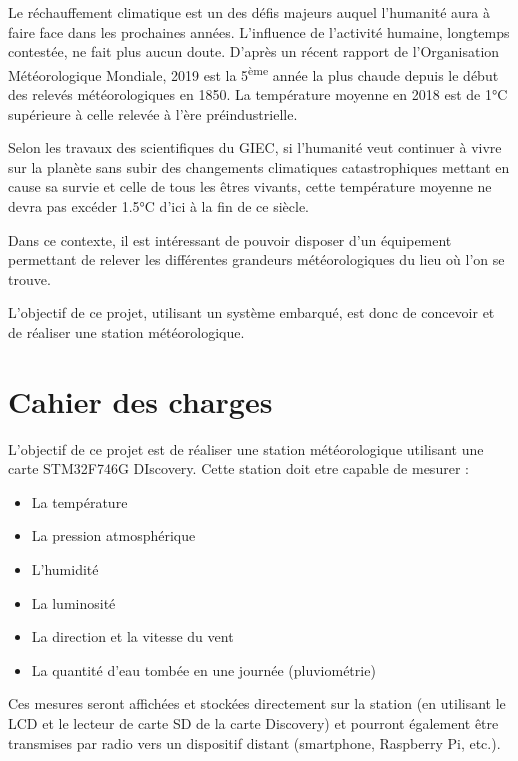 \documentclass[12pt]{article}
\begin{document}
 







\tableofcontents
\label{toc} %


\listoffigures

\newpage


\clearpage
\setcounter{page}{3}

\pagestyle{fancy}


Le réchauffement climatique est un des défis majeurs auquel l’humanité aura à faire face dans les prochaines années. L’influence de l’activité humaine, longtemps contestée, ne fait plus aucun doute. D’après un récent rapport de l’Organisation Météorologique Mondiale, 2019 est la 5\textsuperscript{ème} année la plus chaude depuis le début des relevés météorologiques en 1850. La température moyenne en 2018 est de 1°C supérieure à celle relevée à l’ère préindustrielle.

Selon les travaux des scientifiques du GIEC, si l’humanité veut continuer à vivre sur la planète sans subir des changements climatiques catastrophiques mettant en cause sa survie et celle de tous les êtres vivants, cette température moyenne ne devra pas excéder 1.5°C d’ici à la fin de ce siècle.

Dans ce contexte, il est intéressant de pouvoir disposer d’un équipement permettant de relever les différentes grandeurs météorologiques du lieu où l’on se trouve.

L’objectif de ce projet, utilisant un système embarqué, est donc de concevoir et de réaliser une station météorologique.

\newpage
\vspace{0.5cm}



\section{Cahier des charges}

L'objectif de ce projet est de réaliser une station météorologique utilisant une carte STM32F746G DIscovery.
Cette station doit etre capable de mesurer : 
\begin{itemize}
    \item La température
    \item La pression atmosphérique
    \item L'humidité
    \item La luminosité
    \item La direction et la vitesse du vent
    \item La quantité d'eau tombée en une journée (pluviométrie)
\end{itemize}
Ces mesures seront affichées et stockées directement sur la station (en utilisant le LCD et le lecteur de carte SD de la carte Discovery) et pourront également être transmises par radio vers un dispositif distant (smartphone, Raspberry Pi, etc.).
\end{document}

